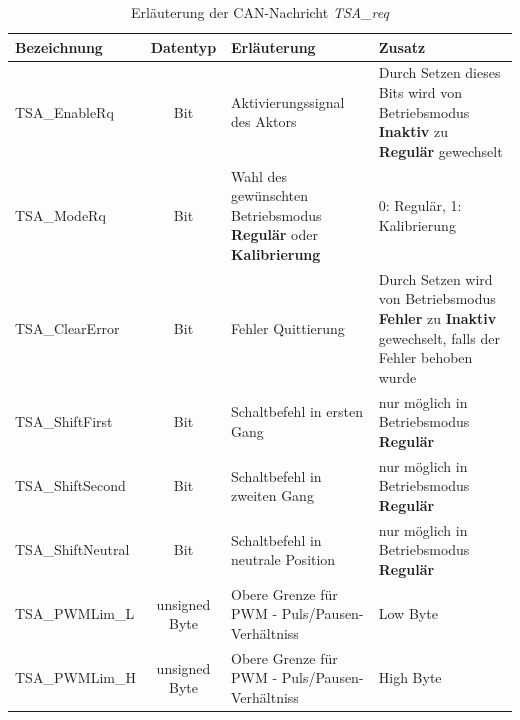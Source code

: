 \begin{table}%
\centering
\begin{tabular}{l c p{6cm} p{4cm}}
\hline
Bezeichnung & Datentyp & Erläuterung & Zusatz \\
\hline
TSA\_EnableRq & Bit & Aktivierungssignal des Aktors & Durch Setzen dieses Bits wird von Betriebsmodus \textbf{Inaktiv} zu \textbf{Regulär} gewechselt \newline \\
TSA\_ModeRq & Bit & Wahl des gewünschten Betriebsmodus \textbf{Regulär} oder  \textbf{Kalibrierung }& 0: Regulär, 1: Kalibrierung \newline \\
TSA\_ClearError & Bit & Fehler Quittierung & Durch Setzen wird von Betriebsmodus \textbf{Fehler} zu \textbf{Inaktiv} gewechselt, falls der Fehler behoben wurde \newline \\
TSA\_ShiftFirst & Bit & Schaltbefehl in ersten Gang & nur möglich in Betriebsmodus \textbf{Regulär} \newline\\
TSA\_ShiftSecond & Bit & Schaltbefehl in zweiten Gang & nur möglich in Betriebsmodus \textbf{Regulär} \newline \\
TSA\_ShiftNeutral & Bit & Schaltbefehl in neutrale Position & nur möglich in Betriebsmodus \textbf{Regulär} \newline \\
TSA\_PWMLim\_L & unsigned Byte & Obere Grenze für PWM - Puls/Pausen- Verhältniss & Low Byte \newline \newline \\
TSA\_PWMLim\_H & unsigned Byte & Obere Grenze für PWM - Puls/Pausen- Verhältniss & High Byte \\
\end{tabular}
\caption{Erläuterung der CAN-Nachricht \textit{TSA\_req}}
\label{tab_tsa_req}
\end{table}

